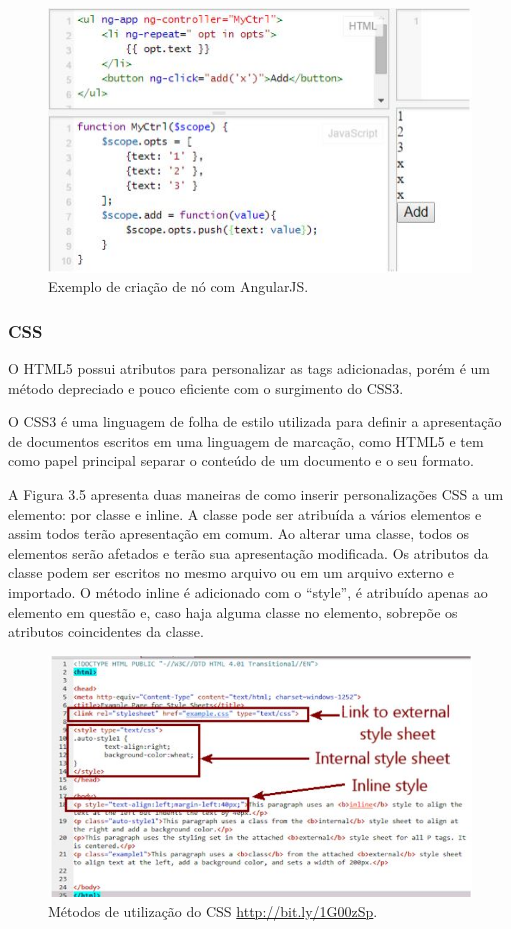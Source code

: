 \documentclass[
  12pt,				%
  openany,
  oneside,
  a4paper,			%
  english,			%
  brazil
]{article}
\numberwithin{figure}{section}
\numberwithin{table}{section}
\begin{document}
\begin{figure}[!h]
\centering
\includegraphics[width=1\textwidth]{figura34}
\caption{Exemplo de criação de nó com AngularJS.}
\end{figure}

\subsubsection{CSS}

O HTML5 possui atributos para personalizar as tags adicionadas, porém é um método depreciado e pouco eficiente com o surgimento do CSS3.

O CSS3 é uma linguagem de folha de estilo utilizada para definir a apresentação de documentos escritos em uma linguagem de marcação, como HTML5 e tem como papel principal separar o conteúdo de um documento e o seu formato.

A Figura 3.5 apresenta duas maneiras de como inserir personalizações CSS a um elemento: por classe e inline. A classe pode ser atribuída a vários elementos e assim todos terão apresentação em comum. Ao alterar uma classe, todos os elementos serão afetados e terão sua apresentação modificada. Os atributos da classe podem ser escritos no mesmo arquivo ou em um arquivo externo e importado. O método inline é adicionado com o “style”, é atribuído apenas ao elemento em questão e, caso haja alguma classe no elemento, sobrepõe os atributos coincidentes da classe.

\begin{figure}[!h]
\centering
\includegraphics[width=1\textwidth]{figura35}
\caption{Métodos de utilização do CSS \url{http://bit.ly/1G00zSp}.}
\end{figure}
\end{document}

